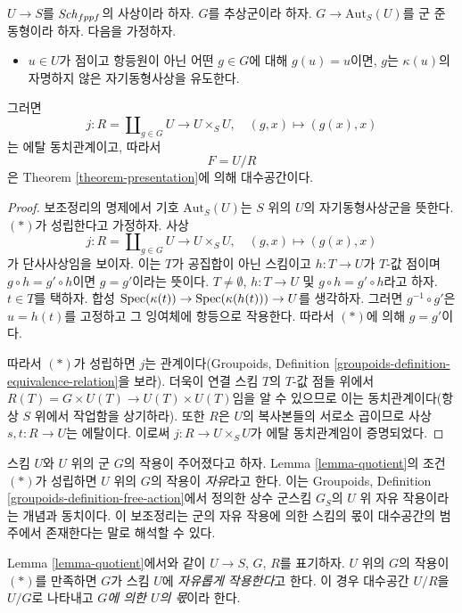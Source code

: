 \begin{lemma}
\label{lemma-quotient}
$U \to S$를 $\mathit{Sch}_{fppf}$의 사상이라 하자.
$G$를 추상군이라 하자. $G \to \text{Aut}_S(U)$를 군 준동형이라 하자.
다음을 가정하자.
\begin{itemize}
\item[(*)] $u \in U$가 점이고 항등원이 아닌 어떤 $g \in G$에 대해
$g(u) = u$이면, $g$는 $\kappa(u)$의 자명하지 않은 자기동형사상을
유도한다.
\end{itemize}
그러면
$$
j :
R = \coprod\nolimits_{g \in G} U
\longrightarrow
U \times_S U,
\quad
(g, x) \longmapsto (g(x), x)
$$
는 에탈 동치관계이고, 따라서
$$
F = U/R
$$
은 Theorem \ref{theorem-presentation}에 의해 대수공간이다.
\end{lemma}

\begin{proof}
보조정리의 명제에서 기호 $\text{Aut}_S(U)$는 $S$ 위의 $U$의
자기동형사상군을 뜻한다. $(*)$가 성립한다고 가정하자. 사상
$$
j :
R = \coprod\nolimits_{g \in G} U
\longrightarrow
U \times_S U,
\quad
(g, x) \longmapsto (g(x), x)
$$
가 단사사상임을 보이자. 이는 $T$가 공집합이 아닌 스킴이고
$h : T \to U$가 $T$-값 점이며 $g \circ h = g' \circ h$이면
$g = g'$이라는 뜻이다. $T \not = \emptyset$, $h : T \to U$ 및
$g \circ h = g' \circ h$라고 하자. $t \in T$를 택하자. 합성
$\mathop{\mathrm{Spec}}(\kappa(t)) \to \mathop{\mathrm{Spec}}(\kappa(h(t))) \to U$를 생각하자.
그러면 $g^{-1} \circ g'$은 $u = h(t)$를 고정하고 그 잉여체에
항등으로 작용한다. 따라서 $(*)$에 의해 $g = g'$이다.

\medskip\noindent
따라서 $(*)$가 성립하면 $j$는 관계이다(Groupoids, Definition
\ref{groupoids-definition-equivalence-relation}을 보라).
더욱이 연결 스킴 $T$의 $T$-값 점들 위에서
$R(T) = G \times U(T) \to U(T) \times U(T)$임을 알 수 있으므로
이는 동치관계이다(항상 $S$ 위에서 작업함을 상기하라). 또한 $R$은
$U$의 복사본들의 서로소 곱이므로 사상 $s, t : R \to U$는 에탈이다.
이로써 $j : R \to U \times_S U$가 에탈 동치관계임이 증명되었다.
\end{proof}

\noindent
스킴 $U$와 $U$ 위의 군 $G$의 작용이 주어졌다고 하자.
Lemma \ref{lemma-quotient}의 조건 $(*)$가 성립하면 $U$ 위의 $G$의
작용이 {\it 자유}라고 한다.
이는 Groupoids, Definition \ref{groupoids-definition-free-action}에서
정의한 상수 군스킴 $G_S$의 $U$ 위 자유 작용이라는 개념과 동치이다.
이 보조정리는 군의 자유 작용에 의한 스킴의 몫이 대수공간의 범주에서
존재한다는 말로 해석할 수 있다.

\begin{definition}
\label{definition-quotient}
Lemma \ref{lemma-quotient}에서와 같이 $U \to S$, $G$, $R$를 표기하자.
$U$ 위의 $G$의 작용이 $(*)$를 만족하면 $G$가 스킴 $U$에
{\it 자유롭게 작용한다}고 한다. 이 경우 대수공간 $U/R$을 $U/G$로
나타내고 {\it $G$에 의한 $U$의 몫}이라 한다.
\end{definition}

